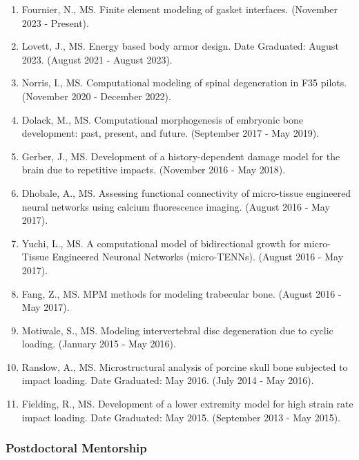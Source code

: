 \documentclass[11pt]{article}
\begin{document}
\begin{enumerate}
\def\labelenumi{\arabic{enumi}.}
\item Fournier, N.,
 MS. 
Finite element modeling of gasket interfaces. 
(November 2023 - Present).
\item Lovett, J.,
 MS. 
Energy based body armor design. 
Date Graduated: August 2023. 
(August 2021 - August 2023).
\item Norris, I., 
MS. 
Computational modeling of spinal degeneration in F35 pilots. 
(November 2020 - December 2022).
\item Dolack, M.,
 MS. 
Computational morphogenesis of embryonic bone development: past, present, and future. 
(September 2017 - May 2019).
\item Gerber, J., 
MS. 
Development of a history-dependent damage model for the brain due to repetitive impacts. 
(November 2016 - May 2018).
\item Dhobale, A.,
 MS. 
Assessing functional connectivity of micro-tissue engineered neural networks using calcium fluorescence imaging. 
(August 2016 - May 2017).
\item Yuchi, L.,
 MS. 
A computational model of bidirectional growth for micro-Tissue Engineered Neuronal Networks (micro-TENNs). 
(August 2016 - May 2017).
\item Fang, Z.,
 MS. 
MPM methods for modeling trabecular bone. 
(August 2016 - May 2017).
\item Motiwale, S.,
 MS. 
Modeling intervertebral disc degeneration due to cyclic loading. 
(January 2015 - May 2016).
\item Ranslow, A.,
 MS. 
Microstructural analysis of porcine skull bone subjected to impact loading. 
Date Graduated: May 2016. 
(July 2014 - May 2016).
\item Fielding, R.,
 MS. 
Development of a lower extremity model for high strain rate impact loading. 
Date Graduated: May 2015. 
(September 2013 - May 2015).
\end{enumerate}
\subsubsection{Postdoctoral Mentorship}
\begin{enumerate}
\def\labelenumi{\arabic{enumi}.}

\end{enumerate}
\end{document}
